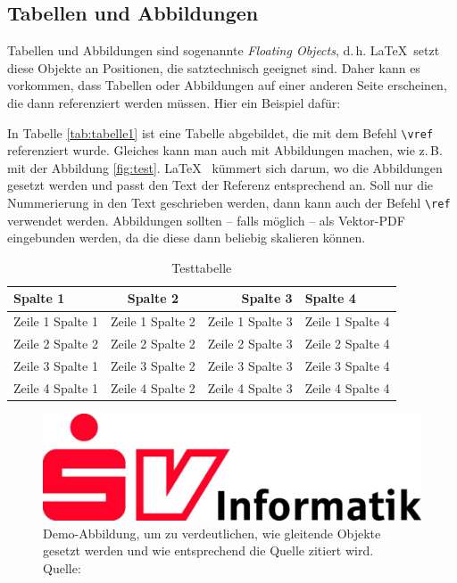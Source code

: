 \subsection{Tabellen und Abbildungen}
Tabellen und Abbildungen sind sogenannte \textit{Floating Objects}, d.\,h. \LaTeX\ setzt diese Objekte an Positionen, die satztechnisch geeignet sind. Daher kann es vorkommen, dass Tabellen oder Abbildungen auf einer anderen Seite erscheinen, die dann referenziert werden müssen. Hier ein Beispiel dafür: 

In Tabelle \vref{tab:tabelle1} ist eine Tabelle abgebildet, die mit dem Befehl \texttt{\textbackslash vref} referenziert wurde. Gleiches kann man auch mit Abbildungen 
machen, wie z.\,B. mit der Abbildung \vref{fig:test}. \LaTeX~ kümmert sich darum, wo die Abbildungen gesetzt werden und passt den Text der Referenz entsprechend an. Soll nur die Nummerierung in den Text geschrieben werden, dann kann auch der Befehl \texttt{\textbackslash ref} verwendet werden.
Abbildungen sollten -- falls möglich -- als Vektor-PDF eingebunden 
werden, da die diese dann beliebig skalieren können.

\lipsum[1]
\begin{savenotes}   %
\begin{table}
	\centering
	\begin{tabular}{p{3cm}crl}
		\textbf{Spalte 1} & \textbf{Spalte 2} & \textbf{Spalte 3} & \textbf{Spalte 4}\\\toprule
		Zeile 1 Spalte 1 &  Zeile 1 Spalte 2 & Zeile 1 Spalte 3 & Zeile 1 Spalte 4\\
		Zeile 2 Spalte 2 &  Zeile 2 Spalte 2 & Zeile 2 Spalte 3 & Zeile 2 Spalte 4\\\midrule
		Zeile 3 Spalte 1 &  Zeile 3 Spalte 2\autocite[Vgl.][S. 18ff.]{ME12} & Zeile 3 Spalte 3 & Zeile 3 Spalte 4\\
		Zeile 4 Spalte 1 &  Zeile 4 Spalte 2 & Zeile 4 Spalte 3 & Zeile 4 Spalte 4\\\bottomrule
	\end{tabular}
	\caption[Testtabelle]{\label{tab:tabelle1}Testtabelle}
\end{table}
\end{savenotes}
\lipsum[1-2]

\begin{figure}
	\centering 
	\includegraphics[scale=0.3]{img/firmenlogo.jpg}
	\captionsetup{format=hang}
	\caption[Optionaler Kurztitel für das Abbildunggsverzeichnis]{\label{fig:test}Demo-Abbildung, um zu verdeutlichen, wie gleitende Objekte gesetzt werden und wie entsprechend die Quelle zitiert wird. \\Quelle: \cite[][S. 223]{TD15}}
\end{figure}
	
